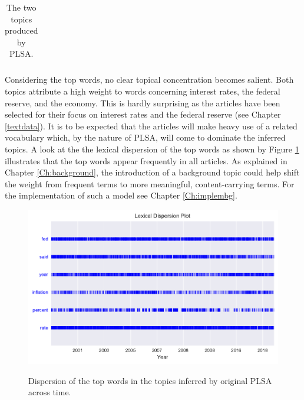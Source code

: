 \documentclass[11pt,a4paper,english,oneside]{book}
\numberwithin{equation}{chapter}
\begin{document}
\begin{table}[h]
\begin{tabular}{ p{3cm}  p{2cm}  p{3cm}  p{2cm} }
		\bottomrule %
	\end{tabular}
	\caption{The two topics produced by PLSA.} %
	\label{tab:topic1} %
\end{table}

Considering the top words, no clear topical concentration becomes salient. Both topics attribute a high weight to words concerning interest rates, the federal reserve, and the economy. This is hardly surprising as the articles have been selected for their focus on interest rates and the federal reserve (see Chapter \ref{textdata}). It is to be expected that the articles will make heavy use of a related vocabulary which, by the nature of PLSA, will come to dominate the inferred topics. A look at the the lexical dispersion of the top words as shown by Figure \ref{dispersionPLSAorig} illustrates that the top words appear frequently in all articles. As explained in Chapter \ref{Ch:background}, the introduction of a background topic could help shift the weight from frequent terms to more meaningful, content-carrying terms. For the implementation of such a model see Chapter \ref{Ch:implembg}.


\begin{figure}
	\caption{Dispersion of the top words in the topics inferred by original PLSA across time.}
	\centering
	\includegraphics[scale=1]{Images/dispersionplot_topicPLSAorig.pdf}
	\label{dispersionPLSAorig}
\end{figure}
\end{document}
